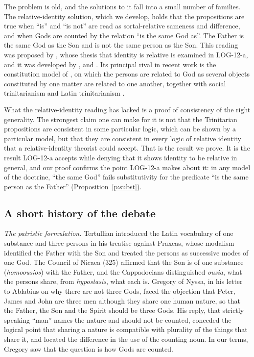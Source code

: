 \documentclass{situationist-preprint}
\begin{document}
The problem is old, and the solutions to it fall into a small number of families. The relative-identity solution, which we develop, holds that the propositions are true when \enquote{is} and \enquote{is not} are read as sortal-relative sameness and difference, and when Gods are counted by the relation \enquote{is the same God as}. The Father is the same God as the Son and is not the same person as the Son. This reading was proposed by \citet{Geach1962,Geach1967}, whose thesis that identity is relative is examined in LOG-12-a, and it was developed by \citet{Martinich1978}, \citet{vanInwagen1988} and \citet{Cain1989}. Its principal rival in recent work is the constitution model of \citet{BrowerRea2005}, on which the persons are related to God as several objects constituted by one matter are related to one another, together with social trinitarianism \citep{Swinburne1994,Hasker2013} and Latin trinitarianism \citep{Leftow2004}.

What the relative-identity reading has lacked is a proof of consistency of the right generality. The strongest claim one can make for it is not that the Trinitarian propositions are consistent in some particular logic, which can be shown by a particular model, but that they are consistent in every logic of relative identity that a relative-identity theorist could accept. That is the result we prove. It is the result LOG-12-a accepts while denying that it shows identity to be relative in general, and our proof confirms the point LOG-12-a makes about it: in any model of the doctrine, \enquote{the same God} fails substitutivity for the predicate \enquote{is the same person as the Father} (Proposition~\ref{p:subst}).

\subsection{A short history of the debate}

\emph{The patristic formulation.} Tertullian introduced the Latin vocabulary of one substance and three persons in his treatise against Praxeas, whose modalism identified the Father with the Son and treated the persons as successive modes of one God. The Council of Nicaea (325) affirmed that the Son is of one substance (\emph{homoousios}) with the Father, and the Cappadocians distinguished \emph{ousia}, what the persons share, from \emph{hypostasis}, what each is. Gregory of Nyssa, in his letter to Ablabius on why there are not three Gods, faced the objection that Peter, James and John are three men although they share one human nature, so that the Father, the Son and the Spirit should be three Gods. His reply, that strictly speaking \enquote{man} names the nature and should not be counted, conceded the logical point that sharing a nature is compatible with plurality of the things that share it, and located the difference in the use of the counting noun. In our terms, Gregory saw that the question is how Gods are counted.
\end{document}
